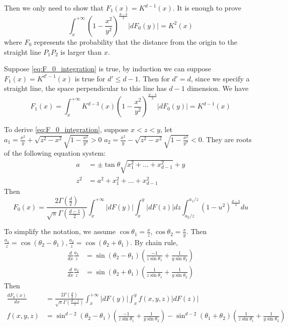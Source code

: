 \documentclass{article}
\begin{document}
Then we only need to show that $F_1(x)=K^{d-1}(x)$.
It is enough to prove
\begin{equation}\label{eq:F_0_integration}
    \int_x^{+\infty}
    (1-\frac{x^2}{y^2})^{\frac{d-3}{2}} |dF_0(y)| = K^2(x)
\end{equation}
where $F_0$ represents the
probability that the distance from the origin to the straight line
$P_1P_2$ is larger than $x$.

Suppose \eqref{eq:F_0_integration} is true, 
by induction we can suppose $F_1(x)=K^{d'-1}(x)$ is true for
$d'\leq d-1$. Then for $d'=d$, 
since we specify a straight line, the space perpendicular 
to this line has $d-1$ dimension. We have
\begin{equation}
    F_1(x) = \int_x^{+\infty} K^{d-3}(x) (1-\frac{x^2}{y^2})^{\frac{d-3}{2}}|dF_0(y)|
    = K^{d-1}(x)
\end{equation}

To derive \eqref{eq:F_0_integration},
suppose $x<z<y$,
let $a_1=\frac{x^2}{y}+\sqrt{z^2-x^2}\sqrt{1-\frac{x^2}{y^2}} > 0$
$a_2=\frac{x^2}{y}-\sqrt{z^2-x^2}\sqrt{1-\frac{x^2}{y^2}} < 0$.
They are roots of the following equation system:
\begin{align*}
a & = \pm \tan \theta \sqrt{x_1^2+\dots + x_{d-1}^2} + y \\    
z^2 &= a^2 + x_1^2 + \dots + x_{d-1}^2
\end{align*}
Then
\begin{equation}
    F_0(x)=\frac{2\Gamma(\frac{d}{2})}
    {\sqrt{\pi}\Gamma(\frac{d-1}{2})}
    \int_x^{+\infty} |dF(y)|
    \int_x^{y} |dF(z)|dz \int_{a_2/z}^{a_1 /z} (1-u^2)^{\frac{d-3}{2}}du
\end{equation}

To simplify the notation,
we assume $\cos\theta_1=\frac{x}{z},
\cos\theta_2=\frac{x}{y}$.
Then $\frac{a_1}{z} = \cos(\theta_2 - \theta_1),
\frac{a_2}{z} = \cos(\theta_2+\theta_1)$.
By chain rule,
\begin{align*}
    \frac{d}{dx}\frac{a_1}{z} &
    = \sin(\theta_2 - \theta_1)
    \left(\frac{-1}{z\sin\theta_1}
    +\frac{1}{y\sin \theta_2}\right)\\
    \frac{d}{dx}\frac{a_2}{z} &
    = \sin(\theta_2 + \theta_1)
    \left(\frac{1}{z\sin\theta_1}
    +\frac{1}{y\sin \theta_2}\right)
\end{align*}
Then
\begin{align*}
    \frac{d F_0(x)}{dx} & =\frac{2\Gamma(\frac{d}{2})}
    {\sqrt{\pi}\Gamma(\frac{d-1}{2})}
    \int_x^{+\infty} |dF(y)| \int_x^y f(x,y,z)|dF(z)| \\
    f(x,y,z) & = \sin^{d-2} (\theta_2 - \theta_1)
    \left(\frac{-1}{z\sin\theta_1}
    +\frac{1}{y\sin \theta_2}\right)
    - \sin^{d-2}(\theta_1 + \theta_2)
    \left(\frac{1}{z\sin\theta_1}
    +\frac{1}{y\sin \theta_2}\right)
\end{align*}
\end{document}
